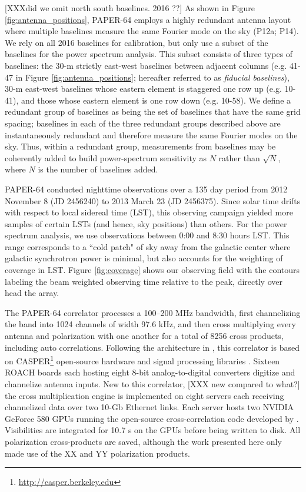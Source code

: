 \documentclass[twocolumn,numberedappendix]{emulateapj} \shorttitle{New Limits on the 21 cm Power Spectrum at $z=8.4$}
\begin{document}
[XXXdid we omit north south baselines. 2016 ??]
As shown in Figure \ref{fig:antenna_positions}, PAPER-64 employs
a highly redundant antenna layout where multiple baselines measure
the same Fourier mode on the sky (P12a; P14).
We rely on all 2016 baselines for calibration,
but only use a subset of the baselines for the power spectrum
analysis. This subset consists of three types of baselines: the 30-m
strictly east-west baselines between adjacent columns (e.g. 41-47
in Figure \ref{fig:antenna_positions}; hereafter referred to 
as {\it fiducial baselines}), 30-m east-west baselines
whose eastern element is staggered one row up (e.g. 10-41), and
those whose eastern element is one row down (e.g. 10-58).
We define a redundant group of
baselines as being the set of baselines that have the same grid spacing;
baselines in each
of the three redundant groups described above are instantaneously redundant and
therefore measure the same Fourier modes on the sky. Thus, within a redundant group,
measurements from baselines may be 
coherently added to build power-spectrum sensitivity as $N$ rather than
$\sqrt{N}$, where $N$ is the number of baselines added.  

PAPER-64 conducted nighttime observations over a 135 day period 
from 2012 November 8 (JD 2456240) to 2013 March 23 (JD 2456375). 
Since solar time drifts with respect to local sidereal time (LST), this observing campaign
yielded more samples of certain LSTs (and hence, sky positions) than others. 
For the power spectrum analysis, we use observations between 0:00 and 8:30 hours
LST.  This range corresponds to
a ``cold patch" of sky away from the galactic center where galactic synchrotron power is minimal,
but also accounts for the weighting of coverage in LST.
Figure \ref{fig:coverage} shows our observing field with the contours labeling
the beam weighted observing time relative to the peak, directly over head the
array.

The PAPER-64 correlator processes a 100--200 MHz bandwidth, first
channelizing the band into 1024 channels of width 97.6 kHz, and then
cross multiplying every antenna and polarization with one another for a total of
8256 cross products, including auto correlations.  Following the architecture 
in \citet{parsons_et_al2008}, this
correlator is based on CASPER\footnote{\url{http://casper.berkeley.edu}} open-source
hardware and signal processing libraries \citep{parsons_et_al2006}.  
Sixteen ROACH boards each hosting eight 8-bit analog-to-digital
converters digitize and channelize antenna inputs. New to this correlator,
[XXX new compared to what?]
the cross multiplication engine is implemented on eight servers each receiving
channelized data over two 10-Gb Ethernet links.  Each server hosts
two NVIDIA GeForce 580 GPUs running the open-source cross-correlation code developed
by \citet{clark_et_al2013}.
Visibilities are integrated for 10.7 s on the GPUs before
being written to disk.  All polarization cross-products are saved, although the
work presented here only made use of the XX and YY polarization products.
\end{document}
